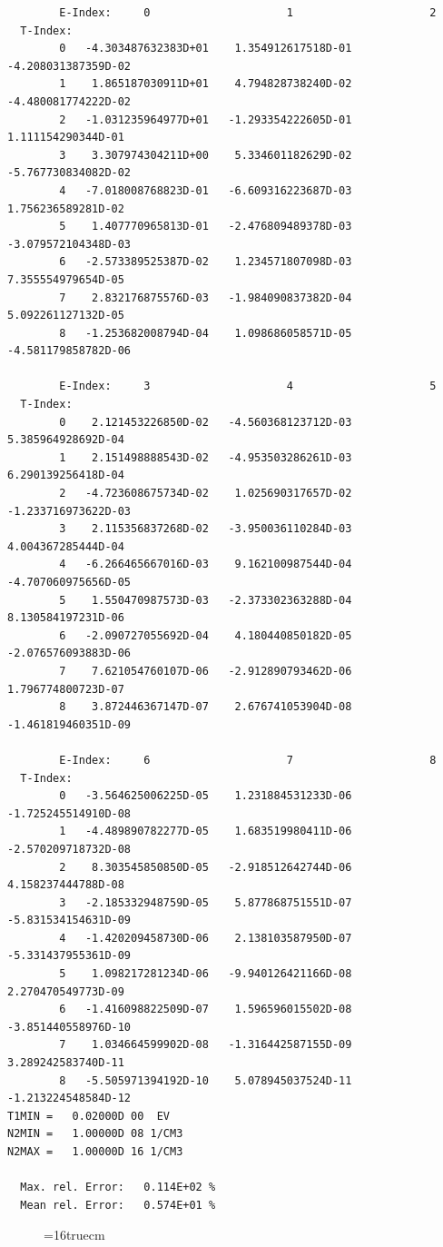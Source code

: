 \documentclass[12pt,dvipdfmx]{article}
\begin{document}
\begin{small}\begin{verbatim}
        E-Index:     0                     1                     2
  T-Index:
        0   -4.303487632383D+01    1.354912617518D-01   -4.208031387359D-02
        1    1.865187030911D+01    4.794828738240D-02   -4.480081774222D-02
        2   -1.031235964977D+01   -1.293354222605D-01    1.111154290344D-01
        3    3.307974304211D+00    5.334601182629D-02   -5.767730834082D-02
        4   -7.018008768823D-01   -6.609316223687D-03    1.756236589281D-02
        5    1.407770965813D-01   -2.476809489378D-03   -3.079572104348D-03
        6   -2.573389525387D-02    1.234571807098D-03    7.355554979654D-05
        7    2.832176875576D-03   -1.984090837382D-04    5.092261127132D-05
        8   -1.253682008794D-04    1.098686058571D-05   -4.581179858782D-06

        E-Index:     3                     4                     5
  T-Index:
        0    2.121453226850D-02   -4.560368123712D-03    5.385964928692D-04
        1    2.151498888543D-02   -4.953503286261D-03    6.290139256418D-04
        2   -4.723608675734D-02    1.025690317657D-02   -1.233716973622D-03
        3    2.115356837268D-02   -3.950036110284D-03    4.004367285444D-04
        4   -6.266465667016D-03    9.162100987544D-04   -4.707060975656D-05
        5    1.550470987573D-03   -2.373302363288D-04    8.130584197231D-06
        6   -2.090727055692D-04    4.180440850182D-05   -2.076576093883D-06
        7    7.621054760107D-06   -2.912890793462D-06    1.796774800723D-07
        8    3.872446367147D-07    2.676741053904D-08   -1.461819460351D-09

        E-Index:     6                     7                     8
  T-Index:
        0   -3.564625006225D-05    1.231884531233D-06   -1.725245514910D-08
        1   -4.489890782277D-05    1.683519980411D-06   -2.570209718732D-08
        2    8.303545850850D-05   -2.918512642744D-06    4.158237444788D-08
        3   -2.185332948759D-05    5.877868751551D-07   -5.831534154631D-09
        4   -1.420209458730D-06    2.138103587950D-07   -5.331437955361D-09
        5    1.098217281234D-06   -9.940126421166D-08    2.270470549773D-09
        6   -1.416098822509D-07    1.596596015502D-08   -3.851440558976D-10
        7    1.034664599902D-08   -1.316442587155D-09    3.289242583740D-11
        8   -5.505971394192D-10    5.078945037524D-11   -1.213224548584D-12
T1MIN =   0.02000D 00  EV
N2MIN =   1.00000D 08 1/CM3
N2MAX =   1.00000D 16 1/CM3

  Max. rel. Error:   0.114E+02 %
  Mean rel. Error:   0.574E+01 %
\end{verbatim}\end{small}
\begin{figure} \label{3.2.3mai}
\epsfxsize=16truecm
\end{figure}
\newpage
\end{document}
